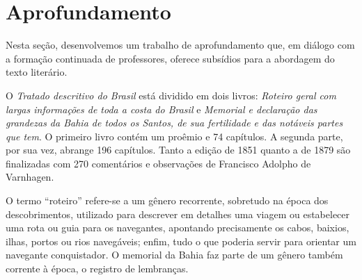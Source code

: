 \documentclass[12pt]{extarticle}
\begin{document}
\section{Aprofundamento}


\begin{comment}
Ao chegar ao Ensino Médio, é necessário que os estudantes se aprofundem
na compreensão das múltiplas linguagens e, sobretudo, da linguagem
literária. Em relação à literatura, a \textsc{bncc} traz as seguintes
considerações:

\begin{quote}
{[}\ldots{}{]} a leitura do texto literário, que ocupa o centro do trabalho
no Ensino Fundamental, deve permanecer nuclear também no Ensino Médio.
Por força de certa simplificação didática, as biografias de autores, as
características de épocas, os resumos e outros gêneros artísticos
substitutivos, como o cinema e as \textsc{hq}s, têm relegado o texto literário a
um plano secundário do ensino. Assim, é importante não só (re)colocá"-lo
como ponto de partida para o trabalho com a literatura, como
intensificar seu convívio com os estudantes. Como linguagem
artisticamente organizada, a literatura enriquece nossa percepção e
nossa visão de mundo. Mediante arranjos especiais das palavras, ela cria
um universo que nos permite aumentar nossa capacidade de ver e sentir.
Nesse sentido, a literatura possibilita uma ampliação da nossa visão do
mundo, ajuda"-nos não só a ver mais, mas a colocar em questão muito do
que estamos vendo/vivenciando. (Brasil, 2018, p. 491)
\end{quote}
\end{comment}


Nesta seção, desenvolvemos um trabalho de aprofundamento que, em diálogo
com a formação continuada de professores, oferece subsídios para a
abordagem do texto literário.

O \textit{Tratado descritivo do Brasil} está dividido em dois livros: 
\textit{Roteiro geral com largas informações de toda a costa do Brasil} e \textit{Memorial e declaração das grandezas da Bahia de todos os Santos, de sua fertilidade e das notáveis partes que tem}. O primeiro livro contém um proêmio e 74 capítulos. A segunda parte, por sua vez, abrange 196 capítulos. Tanto a edição de 1851 quanto a de 1879 são finalizadas com 270 comentários e observações de Francisco Adolpho de Varnhagen.

O termo ``roteiro'' refere-se a um gênero recorrente, sobretudo na época dos descobrimentos, utilizado para descrever em detalhes uma viagem ou estabelecer uma rota ou guia para os navegantes, apontando precisamente os cabos, baixios, ilhas, portos ou rios navegáveis; enfim, tudo o que poderia servir para orientar um navegante conquistador. O memorial da Bahia faz parte de um gênero também corrente à época, o registro de lembranças.
\end{document}
